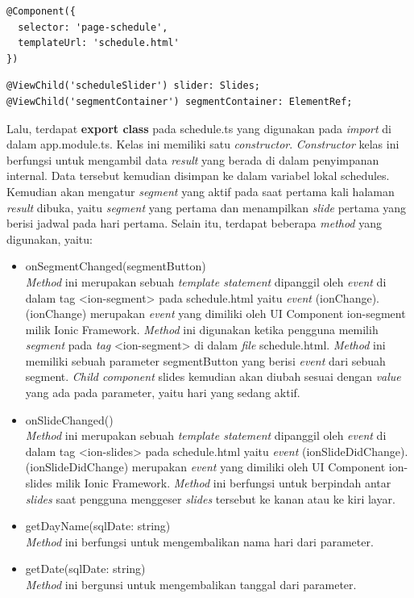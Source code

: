 \begin{itemize}
\begin{lstlisting}[language=html, label={lst:componentschedule}, caption=@Component pada schedule.ts]
@Component({
  selector: 'page-schedule',
  templateUrl: 'schedule.html'
})
\end{lstlisting}

\begin{lstlisting}[language=html, label={lst:viewchildtresult}, caption=@ViewChild pada schedule.ts]
@ViewChild('scheduleSlider') slider: Slides;
@ViewChild('segmentContainer') segmentContainer: ElementRef;
\end{lstlisting} 

	Lalu, terdapat \textbf{export class} pada schedule.ts yang digunakan pada \textit{import} di dalam app.module.ts. Kelas ini memiliki satu \textit{constructor}. \textit{Constructor} kelas ini berfungsi untuk mengambil data \textit{result} yang berada di dalam penyimpanan internal. Data tersebut kemudian disimpan ke dalam variabel lokal schedules. Kemudian akan mengatur \textit{segment} yang aktif pada saat pertama kali halaman \textit{result} dibuka, yaitu \textit{segment} yang pertama dan menampilkan \textit{slide} pertama yang berisi jadwal pada hari pertama. Selain itu, terdapat beberapa \textit{method} yang digunakan, yaitu:
	
	\begin{itemize}
		\item onSegmentChanged(segmentButton) \\
		\textit{Method} ini merupakan sebuah \textit{template statement} dipanggil oleh \textit{event} di dalam tag <ion-segment> pada schedule.html yaitu \textit{event} (ionChange). (ionChange) merupakan \textit{event} yang dimiliki oleh UI Component ion-segment milik Ionic Framework. \textit{Method} ini digunakan ketika pengguna memilih \textit{segment} pada \textit{tag} <ion-segment> di dalam \textit{file} schedule.html. \textit{Method} ini memiliki sebuah parameter segmentButton yang berisi \textit{event} dari sebuah segment. \textit{Child component} slides kemudian akan diubah sesuai dengan \textit{value} yang ada pada parameter, yaitu hari yang sedang aktif. 
		\item onSlideChanged() \\
		\textit{Method} ini merupakan sebuah \textit{template statement} dipanggil oleh \textit{event} di dalam tag <ion-slides> pada schedule.html yaitu \textit{event} (ionSlideDidChange). (ionSlideDidChange) merupakan \textit{event} yang dimiliki oleh UI Component ion-slides milik Ionic Framework. \textit{Method} ini berfungsi untuk berpindah antar \textit{slides} saat pengguna menggeser \textit{slides} tersebut ke kanan atau ke kiri layar.
		\item getDayName(sqlDate: string) \\
		\textit{Method} ini berfungsi untuk mengembalikan nama hari dari parameter.
		\item getDate(sqlDate: string) \\
		\textit{Method} ini bergunsi untuk mengembalikan tanggal dari parameter.
	\end{itemize}
	

\end{itemize}
